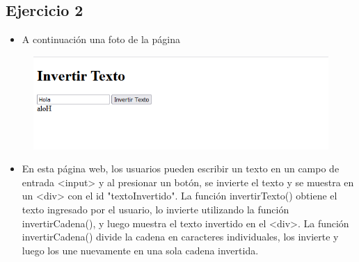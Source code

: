 \documentclass{article}
\begin{document}
	\subsection{Ejercicio 2}
		
	\begin{itemize}
			\item A continuación una foto de la página
		\end{itemize} 
		\begin{figure}[H]
			\centering
			\includegraphics[width=1.0\textwidth,keepaspectratio]{img/ejercicio2.PNG}
		\end{figure}
		\begin{itemize}
			\item En esta página web, los usuarios pueden escribir un texto en un campo de entrada <input> y al presionar un botón, se invierte el texto y se muestra en un <div> con el id "textoInvertido". La función invertirTexto() obtiene el texto ingresado por el usuario, lo invierte utilizando la función invertirCadena(), y luego muestra el texto invertido en el <div>. La función invertirCadena() divide la cadena en caracteres individuales, los invierte y luego los une nuevamente en una sola cadena invertida.
		\end{itemize} 
\end{document}
